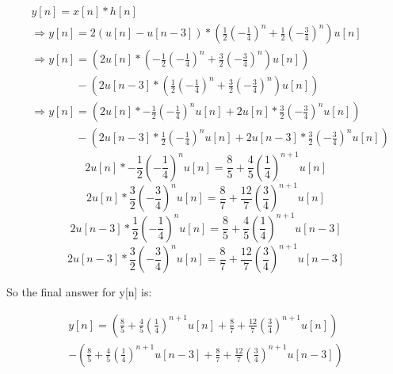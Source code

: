 \documentclass{article}
\begin{document}
\begin{enumerate}
\begin{enumerate}
        \begin{align}
            &y[n] = x[n] * h[n]\\
            &\Rightarrow y[n] = 2(u[n] - u[n-3]) *\left(\frac{1}{2}\left(-\frac{1}{4}\right)^n+\frac{1}{2}\left(-\frac{3}{4}\right)^n\right)u[n]\\
            &\Rightarrow y[n] = \left(2u[n]*\left(-\frac{1}{2}\left(-\frac{1}{4}\right)^n+\frac{3}{2}\left(-\frac{3}{4}\right)^n\right)u[n] \right)\\&\quad\quad\quad\quad-\left(2u[n-3]*\left(\frac{1}{2}\left(-\frac{1}{4}\right)^n+\frac{3}{2}\left(-\frac{3}{4}\right)^n\right)u[n]\right)\\
            &\Rightarrow y[n] = \left(2u[n]*-\frac{1}{2}\left(-\frac{1}{4}\right)^nu[n]+2u[n]*\frac{3}{2}\left(-\frac{3}{4}\right)^nu[n]\right) \\&\quad\quad\quad\quad-\left(2u[n-3]*\frac{1}{2}\left(-\frac{1}{4}\right)^nu[n]+2u[n-3]*\frac{3}{2}\left(-\frac{3}{4}\right)^nu[n]\right)
        \end{align}
        \begin{equation}
            2u[n]*-\frac{1}{2}\left(-\frac{1}{4}\right)^nu[n] = \frac{8}{5}+\frac{4}{5}\left(\frac{1}{4}\right)^{n+1}u[n]
        \end{equation}
        \begin{equation}
            2u[n]*\frac{3}{2}\left(-\frac{3}{4}\right)^nu[n] = 
            \frac{8}{7}+\frac{12}{7}\left(\frac{3}{4}\right)^{n+1}u[n]
        \end{equation}
        \begin{equation}
            2u[n-3]*\frac{1}{2}\left(-\frac{1}{4}\right)^nu[n] = \frac{8}{5}+\frac{4}{5}\left(\frac{1}{4}\right)^{n+1}u[n-3]
        \end{equation}
        \begin{equation}
            2u[n-3]*\frac{3}{2}\left(-\frac{3}{4}\right)^nu[n] = \frac{8}{7}+\frac{12}{7}\left(\frac{3}{4}\right)^{n+1}u[n-3]
        \end{equation}
        \begin{center}
            So the final answer for y[n] is:
        \end{center}
        \begin{align}
            y[n] = \left(\frac{8}{5}+\frac{4}{5}\left(\frac{1}{4}\right)^{n+1}u[n]+\frac{8}{7}+\frac{12}{7}\left(\frac{3}{4}\right)^{n+1}u[n]\right)\\-\left(\frac{8}{5}+\frac{4}{5}\left(\frac{1}{4}\right)^{n+1}u[n-3]+\frac{8}{7}+\frac{12}{7}\left(\frac{3}{4}\right)^{n+1}u[n-3]\right)

\end{align}
\end{enumerate}
\end{enumerate}
\end{document}
